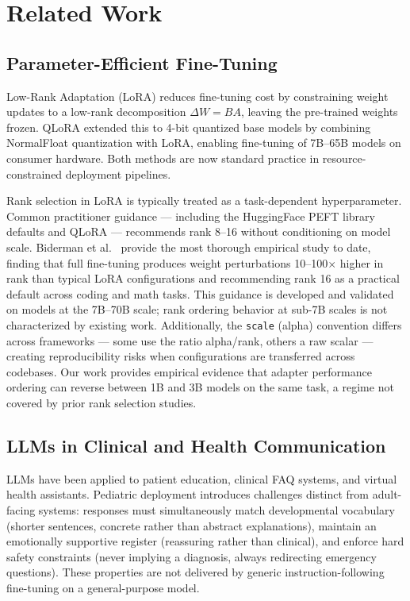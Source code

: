 \documentclass[journal]{IEEEtai}
\begin{document}
\section{Related Work}

\subsection{Parameter-Efficient Fine-Tuning}

Low-Rank Adaptation (LoRA) \cite{hu2022lora} reduces fine-tuning cost by constraining weight updates to a low-rank decomposition $\Delta W = BA$, leaving the pre-trained weights frozen. QLoRA \cite{dettmers2023qlora} extended this to 4-bit quantized base models by combining NormalFloat quantization with LoRA, enabling fine-tuning of 7B--65B models on consumer hardware. Both methods are now standard practice in resource-constrained deployment pipelines.

Rank selection in LoRA is typically treated as a task-dependent hyperparameter. Common practitioner guidance --- including the HuggingFace PEFT library defaults and QLoRA \cite{dettmers2023qlora} --- recommends rank 8--16 without conditioning on model scale. Biderman et al.~\cite{biderman2024lora} provide the most thorough empirical study to date, finding that full fine-tuning produces weight perturbations 10--100$\times$ higher in rank than typical LoRA configurations and recommending rank 16 as a practical default across coding and math tasks. This guidance is developed and validated on models at the 7B--70B scale; rank ordering behavior at sub-7B scales is not characterized by existing work. Additionally, the \texttt{scale} (alpha) convention differs across frameworks --- some use the ratio alpha/rank, others a raw scalar --- creating reproducibility risks when configurations are transferred across codebases. Our work provides empirical evidence that adapter performance ordering can reverse between 1B and 3B models on the same task, a regime not covered by prior rank selection studies.

\subsection{LLMs in Clinical and Health Communication}

LLMs have been applied to patient education, clinical FAQ systems, and virtual health assistants. Pediatric deployment introduces challenges distinct from adult-facing systems: responses must simultaneously match developmental vocabulary (shorter sentences, concrete rather than abstract explanations), maintain an emotionally supportive register (reassuring rather than clinical), and enforce hard safety constraints (never implying a diagnosis, always redirecting emergency questions). These properties are not delivered by generic instruction-following fine-tuning on a general-purpose model.
\end{document}
